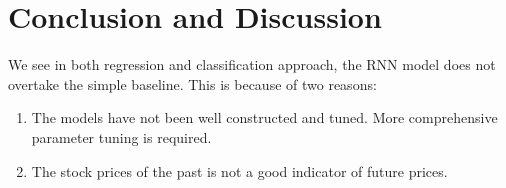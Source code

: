 \documentclass[a4paper, 11pt, usenatbib]{article}
\begin{document}
\section{Conclusion and Discussion}
We see in both regression and classification approach, the RNN model does not overtake the simple baseline. This is because of two reasons:
\begin{enumerate}
 \item The models have not been well constructed and tuned. More comprehensive parameter tuning is required.
 \item The stock prices of the past is not a good indicator of future prices.
\end{enumerate}
\end{document}
